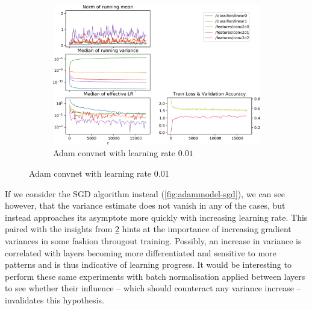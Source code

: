\begin{figure}
    \begin{subfigure}{\textwidth}
        \centering
        \includegraphics[width=\linewidth]{gfx/diagrams/experiments/adam/adammodel_adam_001_0_-1.pdf}
        \caption{Adam convnet with learning rate $0.01$}
        \label{fig:adammodel-3}
    \end{subfigure}
    \label{fig:adammodel}
\end{figure}

If we consider the SGD algorithm instead (\cref{fig:adammodel-sgd}), we can see
however, that the variance estimate does not vanish in any of the cases, but
instead approaches its asymptote more quickly with increasing learning rate.
This paired with the insights from \cref{fig:adammodel} hints at the importance
of increasing gradient variances in some fashion througout training. Possibly,
an increase in variance is correlated with layers becoming more differentiated
and sensitive to more patterns and is thus indicative of learning progress.
It would be interesting to perform these same experiments with batch
normalisation applied between layers to see whether their influence -- which
should counteract any variance increase -- invalidates this hypothesis.

